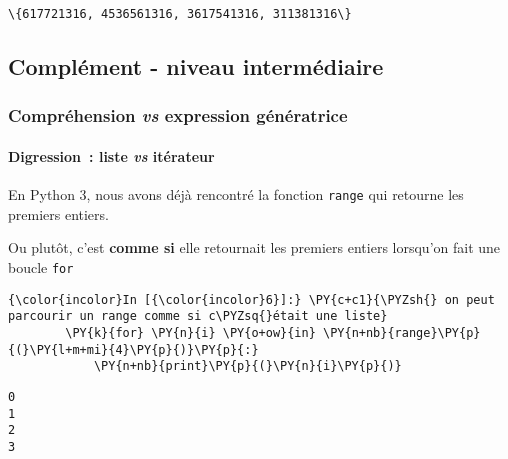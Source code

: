     \begin{Verbatim}[commandchars=\\\{\},frame=single,framerule=0.3mm,rulecolor=\color{cellframecolor}]
\{617721316, 4536561316, 3617541316, 311381316\}
\end{Verbatim}

    \hypertarget{compluxe9ment---niveau-intermuxe9diaire}{%
\subsection{Complément - niveau
intermédiaire}\label{compluxe9ment---niveau-intermuxe9diaire}}

    \hypertarget{compruxe9hension-vs-expression-guxe9nuxe9ratrice}{%
\subsubsection{\texorpdfstring{Compréhension \emph{vs} expression
génératrice}{Compréhension vs expression génératrice}}\label{compruxe9hension-vs-expression-guxe9nuxe9ratrice}}

    \hypertarget{digression-liste-vs-ituxe9rateur}{%
\paragraph{\texorpdfstring{Digression~: liste \emph{vs}
itérateur}{Digression~: liste vs itérateur}}\label{digression-liste-vs-ituxe9rateur}}

    En Python 3, nous avons déjà rencontré la fonction \texttt{range} qui
retourne les premiers entiers.

Ou plutôt, c'est \textbf{comme si} elle retournait les premiers entiers
lorsqu'on fait une boucle \texttt{for}

    \begin{Verbatim}[commandchars=\\\{\},frame=single,framerule=0.3mm,rulecolor=\color{cellframecolor}]
{\color{incolor}In [{\color{incolor}6}]:} \PY{c+c1}{\PYZsh{} on peut parcourir un range comme si c\PYZsq{}était une liste}
        \PY{k}{for} \PY{n}{i} \PY{o+ow}{in} \PY{n+nb}{range}\PY{p}{(}\PY{l+m+mi}{4}\PY{p}{)}\PY{p}{:}
            \PY{n+nb}{print}\PY{p}{(}\PY{n}{i}\PY{p}{)}
\end{Verbatim}


    \begin{Verbatim}[commandchars=\\\{\},frame=single,framerule=0.3mm,rulecolor=\color{cellframecolor}]
0
1
2
3
\end{Verbatim}

